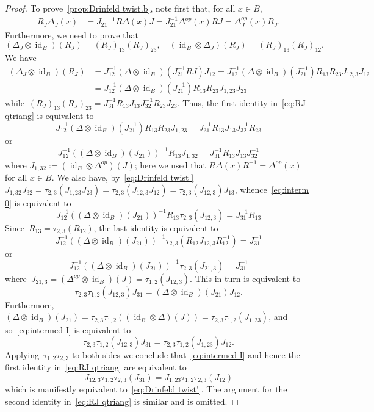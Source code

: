 \documentclass[12pt, reqno]{amsart}
\theoremstyle{definition}
\numberwithin{equation}{section}
\newcommand{\tensor}{\otimes}
\DeclareMathOperator{\id}{id}
\begin{document}
\begin{proof}
To prove~\ref{prop:Drinfeld twist.b}, note first that, for all $x\in B$, 
\begin{align*}
R_J\Delta_J(x)&=J_{21}{}^{-1} R\Delta(x)J=J_{21}^{-1}\Delta^{op}(x)R J=\Delta^{op}_J(x) R_J.
\end{align*}
Furthermore, we need to prove that
\begin{equation}\label{eq:RJ qtriang}
(\Delta_J\tensor \id_B)(R_J)=(R_J)_{13}(R_J)_{23},\quad 
(\id_B\tensor\Delta_J)(R_J)=(R_J)_{13}(R_J)_{12}.
\end{equation}
We have 
\begin{align*}
(\Delta_J\tensor \id_B)(R_J)&=J_{12}^{-1}(\Delta\tensor \id_B)(J_{21}^{-1}R J)J_{12}=J_{12}^{-1}(\Delta\tensor \id_B)(J_{21}^{-1})R_{13}R_{23}J_{12,3}J_{12}\\
&=J_{12}^{-1}(\Delta\tensor \id_B)(J_{21}^{-1})R_{13}R_{23}J_{1,23}J_{23}
\end{align*}
while~$
(R_J)_{13}(R_J)_{23}=J_{31}^{-1}R_{13}J_{13}J_{32}^{-1}R_{23}J_{23}
$.
Thus, the first identity in~\eqref{eq:RJ qtriang} is equivalent to
$$
J_{12}^{-1}(\Delta\tensor \id_B)(J_{21}^{-1})R_{13}R_{23}J_{1,23}=J_{31}^{-1}R_{13}J_{13}J_{32}^{-1}R_{23}
$$
or
\begin{equation}\label{eq:interm 0}
J_{12}^{-1}((\Delta\tensor \id_B)(J_{21}))^{-1}R_{13}J_{1,32}=J_{31}^{-1}R_{13}J_{13}J_{32}^{-1}
\end{equation}
where $J_{1,32}:=(\id_B\tensor\Delta^{op})(J)$; here we used that $R\Delta(x)R^{-1}=\Delta^{op}(x)$ for all $x\in B$.
We also have, by~\eqref{eq:Drinfeld twist'}
$
J_{1,32}J_{32}=\tau_{2,3}(J_{1,23}J_{23})
=\tau_{2,3}(J_{12,3}J_{12})=\tau_{2,3}(J_{12,3})J_{13}$,
whence~\eqref{eq:interm 0} is equivalent to
$$
J_{12}^{-1}((\Delta\tensor \id_B)(J_{21}))^{-1}R_{13}\tau_{2,3}(J_{12,3})=J_{31}^{-1}R_{13}
$$
Since~$R_{13}=\tau_{2,3}(R_{12})$,
the last identity is equivalent to
$$
J_{12}^{-1}((\Delta\tensor \id_B)(J_{21}))^{-1}\tau_{2,3}(R_{12}J_{12,3}R_{12}^{-1})=J_{31}^{-1}
$$
or 
$$
J_{12}^{-1}((\Delta\tensor \id_B)(J_{21}))^{-1}\tau_{2,3}(J_{21,3})=J_{31}^{-1}
$$
where~$J_{21,3}=(\Delta^{op}\tensor\id_B)(J)=\tau_{1,2}(J_{12,3})$.
This in turn is equivalent to
\begin{equation}\label{eq:intermed-I}
\tau_{2,3}\tau_{1,2}(J_{12,3})J_{31}=(\Delta\tensor\id_B)(J_{21})J_{12}.
\end{equation}
Furthermore,
$
(\Delta\tensor \id_B)(J_{21})=\tau_{2,3}\tau_{1,2}((\id_B\tensor\Delta)(J))=\tau_{2,3}\tau_{1,2}(J_{1,23})
$, 
and so~\eqref{eq:intermed-I} is equivalent to
$$
\tau_{2,3}\tau_{1,2}(J_{12,3})J_{31}=\tau_{2,3}\tau_{1,2}(J_{1,23})J_{12}.
$$
Applying~$\tau_{1,2}\tau_{2,3}$ to both sides we conclude that~\eqref{eq:intermed-I} and hence
the first identity in~\eqref{eq:RJ qtriang} are equivalent to
$$
J_{12,3}\tau_{1,2}\tau_{2,3}(J_{31})=J_{1,23}\tau_{1,2}\tau_{2,3}(J_{12})
$$
which is manifestly equivalent
to~\eqref{eq:Drinfeld twist'}. The argument for the second identity in~\eqref{eq:RJ qtriang} is similar and is omitted.


\end{proof}
\end{document}
